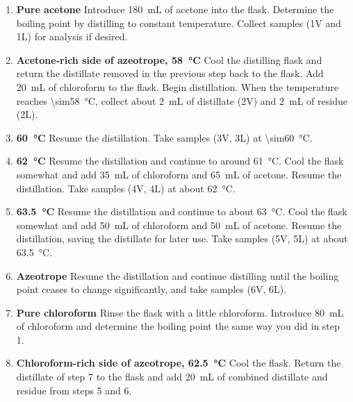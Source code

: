 \begin{enumerate}
	\item \textbf{Pure acetone} Introduce \qty{180}{\mL} of acetone into the flask. 
	Determine the boiling point by distilling to constant temperature.
	Collect samples (1V and 1L) for analysis if desired. 
	\item \textbf{Acetone-rich side of azeotrope, \qty[mode=text, reset-text-series=false]{58}{\celsius}} Cool the distilling flask and return the distillate removed in the previous step back to the flask. 
	Add \qty{20}{\mL} of chloroform to the flask. 
	Begin distillation. 
	When the temperature reaches \qty{\sim58}{\celsius}, collect about \qty{2}{\mL} of distillate (2V) and \qty{2}{\mL} of residue (2L).
	\item \textbf{\qty[mode=text, reset-text-series=false]{60}{\celsius}} Resume the distillation. 
	Take samples (3V, 3L) at \qty{\sim60}{\celsius}.
	\item \textbf{\qty[mode=text, reset-text-series=false]{62}{\celsius}} Resume the distillation and continue to around \qty{61}{\celsius}. 
	Cool the flask somewhat and add \qty{35}{\mL} of chloroform and \qty{65}{\mL} of acetone. 
	Resume the distillation.
	Take samples (4V, 4L) at about \qty{62}{\celsius}. 
	\item \textbf{\qty[mode=text, reset-text-series=false]{63.5}{\celsius}} Resume the distillation and continue to about \qty{63}{\celsius}. 
	Cool the flask somewhat and add \qty{50}{\mL} of chloroform and \qty{50}{\mL} of acetone. 
	Resume the distillation, saving the distillate for later use. 
	Take samples (5V, 5L) at about \qty{63.5}{\celsius}. 
	\item \textbf{Azeotrope} Resume the distillation and continue distilling until the boiling point ceases to change significantly, and take samples (6V, 6L).
	\item \textbf{Pure chloroform} Rinse the flask with a little chloroform. 
	Introduce \qty{80}{\mL} of chloroform and determine the boiling point the same way you did in step 1.
	\item \textbf{Chloroform-rich side of azeotrope, \qty[mode=text, reset-text-series=false]{62.5}{\celsius}} Cool the flask.
	Return the distillate of step 7 to the flask and add \qty{20}{\mL} of combined distillate and residue from steps 5 and 6. 

\end{enumerate}
